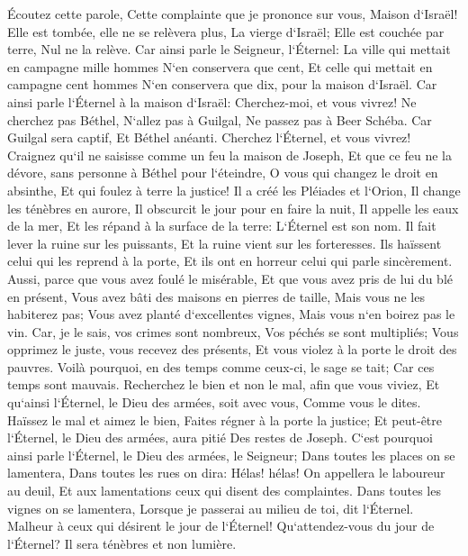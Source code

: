 \verse Écoutez cette parole, Cette complainte que je prononce sur vous, Maison d`Israël! 
\verse Elle est tombée, elle ne se relèvera plus, La vierge d`Israël; Elle est couchée par terre, Nul ne la relève. 
\verse Car ainsi parle le Seigneur, l`Éternel: La ville qui mettait en campagne mille hommes N`en conservera que cent, Et celle qui mettait en campagne cent hommes N`en conservera que dix, pour la maison d`Israël. 
\verse Car ainsi parle l`Éternel à la maison d`Israël: Cherchez-moi, et vous vivrez! 
\verse Ne cherchez pas Béthel, N`allez pas à Guilgal, Ne passez pas à Beer Schéba. Car Guilgal sera captif, Et Béthel anéanti. 
\verse Cherchez l`Éternel, et vous vivrez! Craignez qu`il ne saisisse comme un feu la maison de Joseph, Et que ce feu ne la dévore, sans personne à Béthel pour l`éteindre, 
\verse O vous qui changez le droit en absinthe, Et qui foulez à terre la justice! 
\verse Il a créé les Pléiades et l`Orion, Il change les ténèbres en aurore, Il obscurcit le jour pour en faire la nuit, Il appelle les eaux de la mer, Et les répand à la surface de la terre: L`Éternel est son nom. 
\verse Il fait lever la ruine sur les puissants, Et la ruine vient sur les forteresses. 
\verse Ils haïssent celui qui les reprend à la porte, Et ils ont en horreur celui qui parle sincèrement. 
\verse Aussi, parce que vous avez foulé le misérable, Et que vous avez pris de lui du blé en présent, Vous avez bâti des maisons en pierres de taille, Mais vous ne les habiterez pas; Vous avez planté d`excellentes vignes, Mais vous n`en boirez pas le vin. 
\verse Car, je le sais, vos crimes sont nombreux, Vos péchés se sont multipliés; Vous opprimez le juste, vous recevez des présents, Et vous violez à la porte le droit des pauvres. 
\verse Voilà pourquoi, en des temps comme ceux-ci, le sage se tait; Car ces temps sont mauvais. 
\verse Recherchez le bien et non le mal, afin que vous viviez, Et qu`ainsi l`Éternel, le Dieu des armées, soit avec vous, Comme vous le dites. 
\verse Haïssez le mal et aimez le bien, Faites régner à la porte la justice; Et peut-être l`Éternel, le Dieu des armées, aura pitié Des restes de Joseph. 
\verse C`est pourquoi ainsi parle l`Éternel, le Dieu des armées, le Seigneur; Dans toutes les places on se lamentera, Dans toutes les rues on dira: Hélas! hélas! On appellera le laboureur au deuil, Et aux lamentations ceux qui disent des complaintes. 
\verse Dans toutes les vignes on se lamentera, Lorsque je passerai au milieu de toi, dit l`Éternel. 
\verse Malheur à ceux qui désirent le jour de l`Éternel! Qu`attendez-vous du jour de l`Éternel? Il sera ténèbres et non lumière. 

